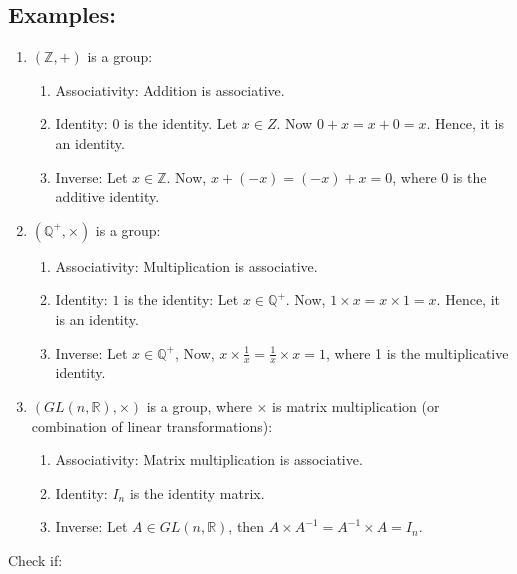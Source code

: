 \documentclass[12pt, oneside]{book}
\begin{document}
\subsection{Examples:}
\begin{enumerate}
    \item \( \left( \mathbb{Z}, +\right) \) is a group:
    \begin{enumerate}
        \item Associativity: Addition is associative.
        \item Identity: \(0\) is the identity. Let \(x \in Z\). Now \(0 + x = x + 0 = x\). Hence, it is an identity.
        \item Inverse: Let \(x \in \mathbb{Z}\). Now, \(x + (-x) = (-x) + x = 0\), where \(0\) is the additive identity.
    \end{enumerate}
    \item \(\left( \mathbb{Q}^{+}, \times \right)\) is a group:
    \begin{enumerate}
        \item Associativity: Multiplication is associative.
        \item Identity: \(1\) is the identity:
        Let \(x \in \mathbb{Q}^{+} \). Now, \(1 \times x = x \times 1 = x\). Hence, it is an identity.
        \item Inverse: Let \(x \in \mathbb{Q}^{+} \), Now, \(x \times \frac{1}{x} = \frac{1}{x} \times x = 1\), where 1 is the multiplicative identity.
    \end{enumerate} \break
    \item \(\left(GL(n,\mathbb{R}), \times \right)\) is a group, where \(\times\) is matrix multiplication (or combination of linear transformations):
    \begin{enumerate}
        \item Associativity: Matrix multiplication is associative.
        \item Identity: \(I_n\) is the identity matrix.
        \item Inverse: Let \(A \in GL(n,\mathbb{R})\), then \(A \times A^{-1} = A^{-1} \times A = I_n\).
    \end{enumerate}
\end{enumerate}
Check if:
\end{document}
